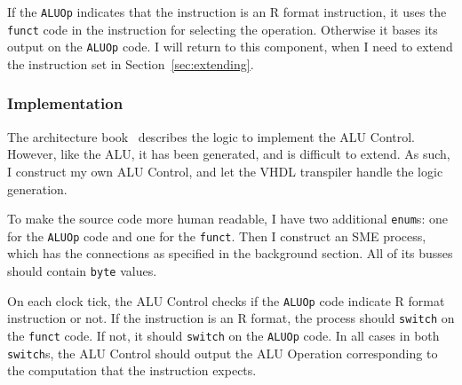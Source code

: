 If the \texttt{ALUOp} indicates that the instruction is an R format
instruction, it uses the \texttt{funct} code in the instruction for selecting
the operation. Otherwise it bases its output on the \texttt{ALUOp} code. I will
return to this component, when I need to extend the instruction set in
Section~\ref{sec:extending}.

\subsubsection*{Implementation}
The architecture book~\cite{ref:ark-book} describes the logic to implement the
ALU Control. However, like the ALU, it has been generated, and is difficult to
extend. As such, I construct my own ALU Control, and let the VHDL transpiler
handle the logic generation.

To make the source code more human readable, I have two additional
\texttt{enum}s: one for the \texttt{ALUOp} code and one for the \texttt{funct}.
Then I construct an SME process, which has the connections as specified in the
background section. All of its busses should contain \texttt{byte} values.

On each clock tick, the ALU Control checks if the \texttt{ALUOp} code indicate
R format instruction or not. If the instruction is an R format, the process
should \texttt{switch} on the \texttt{funct} code. If not, it should
\texttt{switch} on the \texttt{ALUOp} code. In all cases in both
\texttt{switch}s, the ALU Control should output the ALU Operation corresponding
to the computation that the instruction expects.

